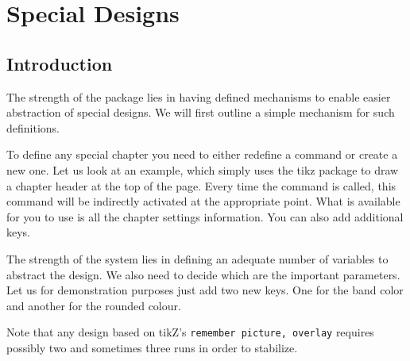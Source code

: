 \makeatletter
{}

\@specialtrue



\@specialtrue

\chapter{Special Designs}
\section{Introduction}


The strength of the package lies in having defined mechanisms to enable easier abstraction of special designs.
We will first outline a simple mechanism for such definitions.

To define any special chapter you need to either redefine a command or create a new one. Let us look at
an example, which simply uses the tikz package to draw a chapter header at the top of the page. Every time the  command is called, this command will be indirectly activated at the appropriate point.
What is available for you to use is all the chapter settings information. You can also add additional keys.


The strength of the system lies in defining an adequate number of variables to abstract the design. We also need to decide which are the important parameters. Let us for demonstration purposes just add two new keys.
One for the band color and another for the rounded colour.

Note that any design based on tikZ's  \texttt{remember picture, overlay} requires possibly two and sometimes three runs in order to stabilize.



